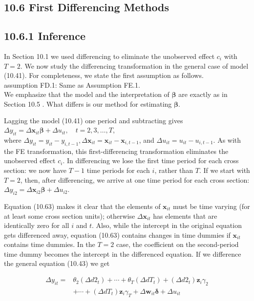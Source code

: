 \documentclass[10pt]{article}
\begin{document}
\subsection*{10.6 First Differencing Methods}
\subsection*{10.6.1 Inference}
In Section 10.1 we used differencing to eliminate the unobserved effect $c_{i}$ with $T=2$. We now study the differencing transformation in the general case of model (10.41). For completeness, we state the first assumption as follows.\\
assumption FD.1: Same as Assumption FE.1.\\
We emphasize that the model and the interpretation of $\boldsymbol{\beta}$ are exactly as in Section 10.5 . What differs is our method for estimating $\boldsymbol{\beta}$.

Lagging the model (10.41) one period and subtracting gives\\
$\Delta y_{i t}=\Delta \mathbf{x}_{i t} \boldsymbol{\beta}+\Delta u_{i t}, \quad t=2,3, \ldots, T$,\\
where $\Delta y_{i t}=y_{i t}-y_{i, t-1}, \Delta \mathbf{x}_{i t}=\mathbf{x}_{i t}-\mathbf{x}_{i, t-1}$, and $\Delta u_{i t}=u_{i t}-u_{i, t-1}$. As with the FE transformation, this first-differencing transformation eliminates the unobserved effect $c_{i}$. In differencing we lose the first time period for each cross section: we now have $T-1$ time periods for each $i$, rather than $T$. If we start with $T=2$, then, after differencing, we arrive at one time period for each cross section: $\Delta y_{i 2}=\Delta \mathbf{x}_{i 2} \boldsymbol{\beta}+\Delta u_{i 2}$.

Equation (10.63) makes it clear that the elements of $\mathbf{x}_{i t}$ must be time varying (for at least some cross section units); otherwise $\Delta \mathbf{x}_{i t}$ has elements that are identically zero for all $i$ and $t$. Also, while the intercept in the original equation gets differenced away, equation (10.63) contains changes in time dummies if $\mathbf{x}_{i t}$ contains time dummies. In the $T=2$ case, the coefficient on the second-period time dummy becomes the intercept in the differenced equation. If we difference the general equation (10.43) we get


\begin{align*}
\Delta y_{i t}= & \theta_{2}\left(\Delta d 2_{t}\right)+\cdots+\theta_{T}\left(\Delta d T_{t}\right)+\left(\Delta d 2_{t}\right) \mathbf{z}_{i} \gamma_{2} \\
& +\cdots+\left(\Delta d T_{t}\right) \mathbf{z}_{i} \gamma_{T}+\Delta \mathbf{w}_{i t} \boldsymbol{\delta}+\Delta u_{i t} \tag{10.64}
\end{align*}
\end{document}

